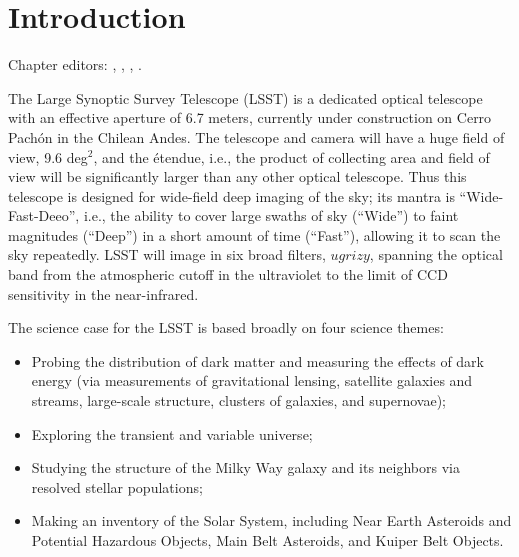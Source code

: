 \chapter[Introduction]{Introduction}
\def\chpname{intro}\label{chp:\chpname}

Chapter editors:
,
,
,
.

The Large Synoptic Survey Telescope (LSST) is a dedicated optical
telescope with an effective aperture of 6.7 meters, currently under
construction on Cerro Pach\'on in the Chilean Andes.  The telescope
and camera will have a huge field of view, 9.6 deg$^2$, and the
\'etendue, i.e., the product of collecting area and field of view will
be significantly larger than any other optical telescope.  Thus this telescope
is designed for wide-field deep imaging of the sky; its mantra is
``Wide-Fast-Deeo'', i.e., the ability to cover large swaths of sky
(``Wide'') to faint magnitudes (``Deep'') in a short amount of time
(``Fast''), allowing it to scan the sky repeatedly.  LSST will image
in six broad filters, $ugrizy$, spanning the optical band from the
atmospheric cutoff in the ultraviolet to the limit of CCD sensitivity
in the near-infrared.

The science case for the LSST is based broadly on four science themes:
\begin{itemize}
\item Probing the distribution of dark matter and measuring the effects
  of dark energy (via measurements of gravitational
  lensing, satellite galaxies and streams, large-scale structure,
  clusters of galaxies, and supernovae);
\item Exploring the transient and variable universe;
\item Studying the structure of the Milky Way galaxy and its neighbors
  via resolved stellar populations;
\item Making an inventory of the Solar System, including Near Earth
  Asteroids and Potential Hazardous Objects, Main Belt Asteroids, and
  Kuiper Belt Objects.
\end{itemize}

